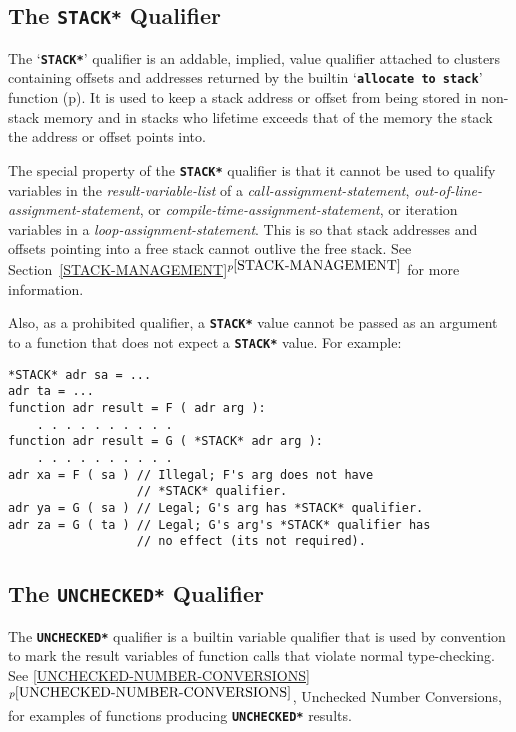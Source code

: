 \documentclass[12pt]{article}
\makeatletter
\newcommand{\TT}[1]{{\tt \bfseries #1}}
\newcommand{\ttakey}[1]{\TT{*#1*}\index{#1@{\tt *#1*}}}
\newcommand{\itemref}[1]{\ref{#1}$^{p\pageref{#1}}$}
\newcommand{\pagref}[1]{p\pageref{#1}}
\newenvironment{indpar}[1][0.3in]%
	{\begin{list}{}%
		     {\setlength{\itemsep}{0in}%
		      \setlength{\topsep}{0in}%
		      \setlength{\parsep}{1ex}%
		      \setlength{\labelwidth}{#1}%
		      \setlength{\leftmargin}{#1}%
		      \addtolength{\leftmargin}{\labelsep}}%
	 \item}%
	{\end{list}}
\makeatother
\begin{document}
\subsection{The \TT{*STACK*} Qualifier}
\label{THE-STACK-QUALIFIER}

The `\ttakey{STACK}' qualifier is an addable,
implied, value qualifier
attached to clusters containing offsets and addresses
returned by the builtin `\TT{allocate to stack}'
function (\pagref{ALLOCATE-TO-STACK}).
It is used to keep a stack address or offset from being stored in
non-stack memory and in stacks who lifetime exceeds that of the
memory the stack the address or offset points into.

The special property of the \TT{*STACK*} qualifier is that it cannot
be used to qualify variables in the {\em result-variable-list}
of a {\em call-assignment-statement},
{\em out-of-line-assignment-statement}, or
{\em compile-time-assignment-statement},
or iteration variables in a {\em loop-assignment-statement}.
This is so that stack addresses and offsets pointing into a free stack
cannot outlive the free stack.
See Section~\itemref{STACK-MANAGEMENT} for more information.

Also, as a prohibited qualifier, a \TT{*STACK*} value cannot be
passed as an argument to a function that does not expect a
\TT{*STACK*} value.  For example:
\begin{indpar}\begin{verbatim}
*STACK* adr sa = ...
adr ta = ...
function adr result = F ( adr arg ):
    . . . . . . . . . .
function adr result = G ( *STACK* adr arg ):
    . . . . . . . . . .
adr xa = F ( sa ) // Illegal; F's arg does not have
                  // *STACK* qualifier.
adr ya = G ( sa ) // Legal; G's arg has *STACK* qualifier.
adr za = G ( ta ) // Legal; G's arg's *STACK* qualifier has
                  // no effect (its not required).
\end{verbatim}\end{indpar}

\subsection{The \TT{*UNCHECKED*} Qualifier}
\label{THE-UNCHECKED-QUALIFIER}

The \ttakey{UNCHECKED} qualifier is a builtin
variable qualifier that is used by convention to mark the result variables
of function calls that violate normal type-checking.
See \itemref{UNCHECKED-NUMBER-CONVERSIONS}, Unchecked Number
Conversions, for examples of functions producing \TT{*UNCHECKED*}
results.
\end{document}
